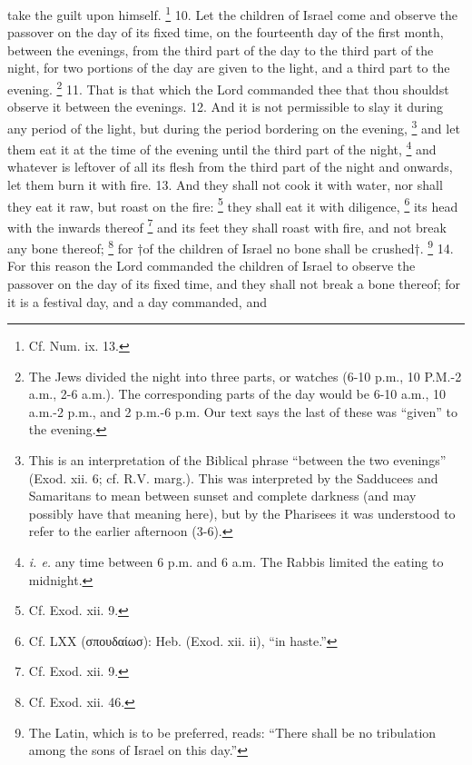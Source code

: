 take the guilt upon himself. \footnote{Cf. Num. ix. 13.} 10. Let the children of Israel come and observe the passover on the day of its fixed time, on the fourteenth day of the first month, between the evenings, from the third part of the day to the third part of the night, for two portions of the day are given to the light, and a third part to the evening. \footnote{The Jews divided the night into three parts, or watches (6-10 p.m., 10 P.M.-2 a.m., 2-6 a.m.). The corresponding parts of the day would be 6-10 a.m., 10 a.m.-2 p.m., and 2 p.m.-6 p.m. Our text says the last of these was ``given'' to the evening.} 11. That is that which the Lord commanded thee that thou shouldst observe it between the evenings. 12. And it is not permissible to slay it during any period of the light, but during the period bordering on the evening, \footnote{This is an interpretation of the Biblical phrase ``between the two evenings'' (Exod. xii. 6; cf. R.V. marg.). This was interpreted by the Sadducees and Samaritans to mean between sunset and complete darkness (and may possibly have that meaning here), but by the Pharisees it was understood to refer to the earlier afternoon (3-6).} and let them eat it at the time of the evening until the third part of the night, \footnote{\emph{i. e.} any time between 6 p.m. and 6 a.m. The Rabbis limited the eating to midnight.} and whatever is leftover of all its flesh from the third part of the night and onwards, let them burn it with fire. 13. And they shall not cook it with water, nor shall they eat it raw, but roast on the fire: \footnote{Cf. Exod. xii. 9.} they shall eat it with diligence, \footnote{Cf. LXX (\textgreek{σπουδαίωσ}): Heb. (Exod. xii. ii), ``in haste.''} its head with the inwards thereof \footnote{Cf. Exod. xii. 9.} and its feet they shall roast with fire, and not break any bone thereof; \footnote{Cf. Exod. xii. 46.} for †of the children of Israel no bone shall be crushed†. \footnote{The Latin, which is to be preferred, reads: ``There shall be no tribulation among the sons of Israel on this day.''} 14. For this reason the Lord commanded the children of Israel to observe the passover on the day of its fixed time, and they shall not break a bone thereof; for it is a festival day, and a day commanded, and

